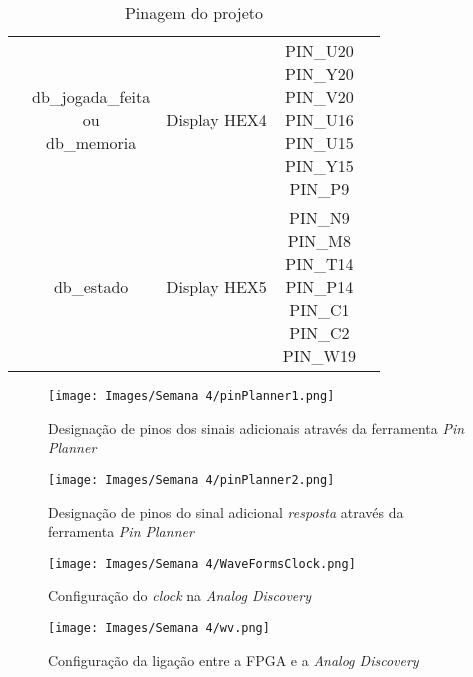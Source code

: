 \documentclass[amsmath,amssymb,floatfix]{report}
\begin{document}
\begin{table}[H]
\begin{tabular}{c|c|c|c|c|}
\multicolumn{1}{|c|}{}                           & \thead{db\_jogada\_feita \\ ou \\ db\_memoria} & Display HEX4         & \thead{PIN\_U20\\ PIN\_Y20\\ PIN\_V20\\ PIN\_U16\\ PIN\_U15\\ PIN\_Y15\\ PIN\_P9}                                                                                                     & \multicolumn{1}{l|}{}          \\ \cline{2-5} 
\multicolumn{1}{|c|}{}                           & db\_estado              & Display HEX5 & \thead{PIN\_N9 \\ PIN\_M8 \\ PIN\_T14 \\  PIN\_P14 \\  PIN\_C1 \\ PIN\_C2 \\ PIN\_W19}                                                                       & \multicolumn{1}{l|}{}          \\ \hline
\end{tabular}
\caption{Pinagem do projeto}
\label{tab:pinagemFPGA4}
\end{table}

\begin{figure}[H]
\centering
\texttt{[image: Images/Semana 4/pinPlanner1.png]}
    \caption{Designação de pinos dos sinais adicionais através da ferramenta \textit{Pin Planner}}
    \label{fig:pinPlanner41}
\end{figure}

\begin{figure}[H]
\centering
\texttt{[image: Images/Semana 4/pinPlanner2.png]}
    \caption{Designação de pinos do sinal adicional \textit{resposta} através da ferramenta \textit{Pin Planner}}
    \label{fig:pinPlanner42}
\end{figure}

\begin{figure}[H]
\centering
\texttt{[image: Images/Semana 4/WaveFormsClock.png]}
    \caption{Configuração do \textit{clock} na \textit{Analog Discovery}}
    \label{fig:wfClock4}
\end{figure}

\begin{figure}[H]
\centering
\texttt{[image: Images/Semana 4/wv.png]} 
    \caption{Configuração da ligação entre a FPGA e a \textit{Analog Discovery}}
    \label{fig:wv4}
\end{figure}
\end{document}
